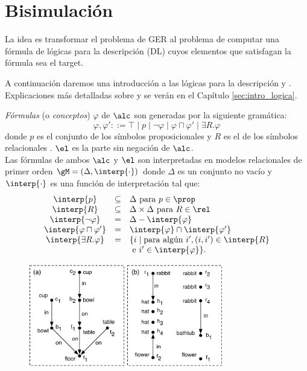 
\chapter{Bisimulaci\'on}
\label{bisimulacion}


La idea es transformar el problema de GER al problema de computar una f\'ormula de l\'ogicas para la descripci\'on (DL) cuyos elementos que satisfagan la f\'ormula sea el target.%

A continuaci\'on daremos una introducci\'on a las l\'ogicas para la descripci\'on \alc y \el. Explicaciones m\'as detalladas sobre \alc y \el se ver\'an en el Cap\'itulo \ref{sec:intro_logica}.

\emph{F\'ormulas} (o \emph{conceptos}) $\varphi$ de $\alc$ son generadas por la siguiente gram\'atica:
$$
\varphi,\varphi' ::= \top \mid p \mid \neg \varphi \mid \varphi \sqcap \varphi'
\mid \exists R. \varphi
$$
donde $p$ es el conjunto de los s\'imbolos proposicionales \prop y $R$ es el de los s\'imbolos relacionales \rel. $\el$ es la parte sin negaci\'on de $\alc$.\\

Las f\'ormulas de ambos $\alc$ y $\el$ son interpretadas en modelos relacionales de primer orden $\gM = (\Delta,\interp{\cdot})$ donde
$\Delta$ es un conjunto no vac\'io y $\interp{\cdot}$ es una funci\'on de interpretaci\'on tal que:
$$
\begin{array}{ccl}
\interp{p} & \subseteq & \Delta  \mbox{ para $p \in \prop$}\\
\interp{R} & \subseteq & \Delta \times \Delta  \mbox{ para $R \in \rel$}\\
\interp{\neg \varphi} & = & \Delta - \interp{\varphi}\\
\interp{\varphi \sqcap \varphi'} & = & \interp{\varphi} \cap \interp{\varphi'}\\
\interp{\exists R.\varphi} & = & \{i \mid \mbox{para alg\'un } i', (i,i') \in \interp{R}\\
& & \mbox{ e } i' \in \interp{\varphi} \}.\\
\end{array}
$$

\begin{figure}[ht]
\begin{center}
\includegraphics[width=8.5cm]{figures/pic-dale-haddock.pdf}\\[0pt]
\caption{}
\label{fig:dale-haddock}
\end{center}
\end{figure}


